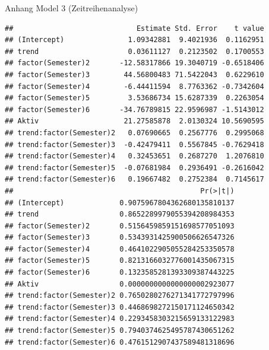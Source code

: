 \documentclass[
  ignorenonframetext,
]{beamer}
\begin{document}
\begin{frame}[fragile]
\begin{block}{Anhang Model 3 (Zeitreihenanalyse)}
\protect\hypertarget{anhang-model-3-zeitreihenanalyse}{}
\begin{verbatim}
##                             Estimate Std. Error    t value
## (Intercept)               1.09342881  9.4021936  0.1162951
## trend                     0.03611127  0.2123502  0.1700553
## factor(Semester)2       -12.58317866 19.3040719 -0.6518406
## factor(Semester)3        44.56800483 71.5422043  0.6229610
## factor(Semester)4        -6.44411594  8.7763362 -0.7342604
## factor(Semester)5         3.53686734 15.6287339  0.2263054
## factor(Semester)6       -34.76789815 22.9596987 -1.5143012
## Aktiv                    21.27585878  2.0130324 10.5690595
## trend:factor(Semester)2   0.07690665  0.2567776  0.2995068
## trend:factor(Semester)3  -0.42479411  0.5567845 -0.7629418
## trend:factor(Semester)4   0.32453651  0.2687270  1.2076810
## trend:factor(Semester)5  -0.07681984  0.2936491 -0.2616042
## trend:factor(Semester)6   0.19667482  0.2752384  0.7145617
##                                            Pr(>|t|)
## (Intercept)             0.9075967804362680135810137
## trend                   0.8652289979055394208984353
## factor(Semester)2       0.5156459859151698577051093
## factor(Semester)3       0.5343931425900506626547326
## factor(Semester)4       0.4641022905055284253350578
## factor(Semester)5       0.8213166032776001435067315
## factor(Semester)6       0.1323585281393309387443225
## Aktiv                   0.0000000000000000002923077
## trend:factor(Semester)2 0.7650280276271341772797996
## trend:factor(Semester)3 0.4468698272150171124650342
## trend:factor(Semester)4 0.2293458303215659133122983
## trend:factor(Semester)5 0.7940374625495787430651262
## trend:factor(Semester)6 0.4761512907437589481318696
\end{verbatim}
\end{block}
\end{frame}
\end{document}
